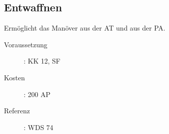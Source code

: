 \subsection{Entwaffnen}
\label{sf.entwaffnen}
Ermöglicht das Manöver  aus der AT und  aus der PA.
\begin{description}
    \item[Voraussetzung]:
        KK 12, SF 
    \item [Kosten]:
        200 AP
    \item [Referenz]:
        WDS 74
\end{description}
